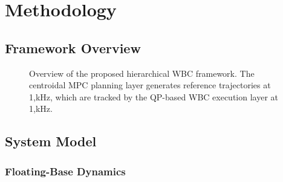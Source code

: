 
\chapter{Methodology}
\label{chap:methodology}


\lipsum[14]

\section{Framework Overview}
\label{sec:framework-overview}


\begin{figure}[htb]
  \centering
  \fbox{\rule{0pt}{4cm}\rule{8cm}{0pt}}  %
  \caption{Overview of the proposed hierarchical WBC framework. The centroidal
           MPC planning layer generates reference trajectories at 1,kHz,
           which are tracked by the QP-based WBC execution layer at 1,kHz.}
  \label{fig:framework-overview}
\end{figure}

\lipsum[15]

\begin{criticalinsight}
\end{criticalinsight}

\section{System Model}
\label{sec:system-model}

\subsection{Floating-Base Dynamics}
\label{sec:floating-base}

